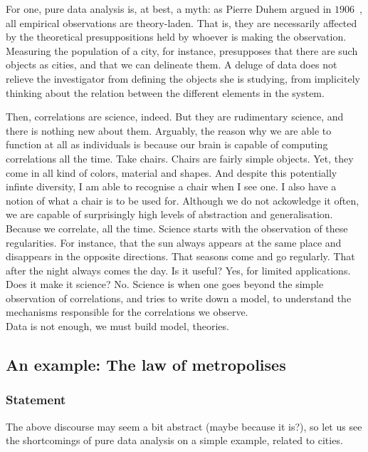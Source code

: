 For one, pure data analysis is, at best, a myth: as Pierre Duhem argued in
$1906$~\cite{Duhem:1997}, all empirical observations are theory-laden. That is,
they are necessarily affected by the theoretical presuppositions held by whoever
is making the observation. Measuring the population of a city, for instance,
presupposes that there are such objects as cities, and that we can delineate
them. A deluge of data does not relieve the investigator from defining the
objects she is studying, from implicitely thinking about the relation between
the different elements in the system.

Then, correlations are science, indeed. But they are rudimentary science, and
there is nothing new about them. Arguably, the reason why we are able to
function at all as individuals is because our brain is capable of computing
correlations all the time. Take chairs. Chairs are fairly simple objects. Yet,
they come in all kind of colors, material and shapes. And despite this
potentially infinte diversity, I am able to recognise a chair when I see one. I
also have a notion of what a chair is to be used for. Although we do not
ackowledge it often, we are capable of surprisingly high levels of abstraction
and generalisation. Because we correlate, all the time. Science starts with the
observation of these regularities. For instance, that the sun always appears at
the same place and disappears in the opposite directions. That seasons come and
go regularly. That after the night always comes the day. Is it useful? Yes, for
limited applications. Does it make it science? No. Science is when one goes
beyond the simple observation of correlations, and tries to write down a model,
to understand the mechanisms responsible for the correlations we observe.\\

Data is not enough, we must build model, theories.


\subsection{An example: The law of metropolises}
\label{sec:an_example_the_law_of_metropolises}

\subsubsection{Statement}
\label{sub:statement}

The above discourse may seem a bit abstract (maybe because it is?), so let us
see the shortcomings of pure data analysis on a simple example, related to
cities.

